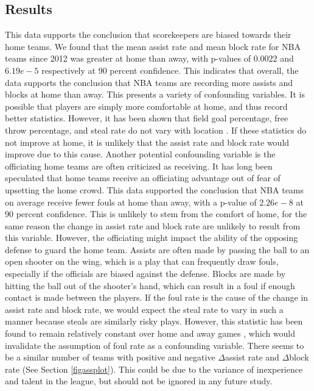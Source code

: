 \documentclass{article}
\begin{document}
\subsection{Results}
This data supports the conclusion that scorekeepers are biased towards their home teams. We found that the mean assist rate and mean block rate for NBA teams since 2012 was greater at home than away, with p-values of $0.0022$ and $6.19e-5$ respectively at 90 percent confidence. This indicates that overall, the data supports the conclusion that NBA teams are recording more assists and blocks at home than away. This presents a variety of confounding variables. It is possible that players are simply more comfortable at home, and thus record better statistics. However, it has been shown that field goal percentage, free throw percentage, and steal rate do not vary with location \cite{moskowitz2011scorecasting}. If these statistics do not improve at home, it is unlikely that the assist rate and block rate would improve due to this cause. Another potential confounding variable is the officiating home teams are often criticized as receiving. It has long been speculated that home teams receive an officiating advantage out of fear of upsetting the home crowd. This data supported the conclusion that NBA teams on average receive fewer fouls at home than away, with a p-value of $2.26e-8$ at 90 percent confidence. This is unlikely to stem from the comfort of home, for the same reason the change in assist rate and block rate are unlikely to result from this variable. However, the officiating might impact the ability of the opposing defense to guard the home team. Assists are often made by passing the ball to an open shooter on the wing, which is a play that can frequently draw fouls, especially if the officials are biased against the defense. Blocks are made by hitting the ball out of the shooter's hand, which can result in a foul if enough contact is made between the players. If the foul rate is the cause of the change in assist rate and block rate, we would expect the steal rate to vary in such a manner because steals are similarly risky plays. However, this statistic has been found to remain relatively constant over home and away games \cite{moskowitz2011scorecasting}, which would invalidate the assumption of foul rate as a confounding variable. There seems to be a similar number of teams with positive and negative $\Delta$assist rate and $\Delta$block rate (See Section \ref{figassplot}). This could be due to the variance of inexperience and talent in the league, but should not be ignored in any future study.
\end{document}
